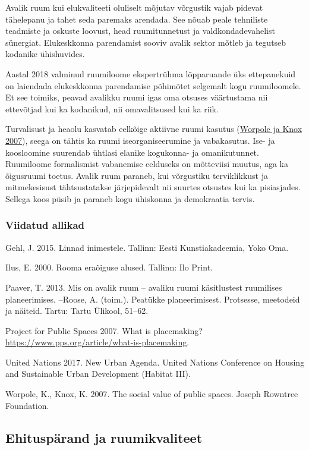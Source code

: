 \documentclass[estonian,]{article}
\begin{document}
Avalik ruum kui elukvaliteeti oluliselt mõjutav võrgustik vajab pidevat tähelepanu ja tahet seda paremaks arendada. See nõuab peale tehniliste teadmiste ja oskuste loovust, head ruumitunnetust ja valdkondadevahelist sünergiat. Elukeskkonna parendamist sooviv avalik sektor mõtleb ja tegutseb kodanike ühishuvides.

Aastal 2018 valminud ruumiloome ekspertrühma lõpparuande üks ettepanekuid on laiendada elukeskkonna parendamise põhimõtet selgemalt kogu ruumiloomele. Et see toimiks, peavad avalikku ruumi igas oma otsuses väärtustama nii ettevõtjad kui ka kodanikud, nii omavalitsused kui ka riik.

Turvalisust ja heaolu kasvatab eelkõige aktiivne ruumi kasutus (\protect\hyperlink{Worpole2007}{Worpole ja Knox 2007}), seega on tähtis ka ruumi iseorganiseerumine ja vabakasutus. Ise- ja koosloomine suurendab ühtlasi elanike kogukonna- ja omanikutunnet. Ruumiloome formalismist vabanemise eelduseks on mõtteviisi muutus, aga ka õigusruumi toetus. Avalik ruum paraneb, kui võrgustiku terviklikkust ja mitmekesisust tähtsustatakse järjepidevalt nii suurtes otsustes kui ka pisiasjades. Sellega koos püsib ja paraneb kogu ühiskonna ja demokraatia tervis.

\hypertarget{viidatud-allikad-7}{%
\subsubsection*{Viidatud allikad}\label{viidatud-allikad-7}}

Gehl, J. 2015. Linnad inimestele. Tallinn: Eesti Kunstiakadeemia, Yoko Oma.

Ilus, E. 2000. Rooma eraõiguse alused. Tallinn: Ilo Print.

Paaver, T. 2013. Mis on avalik ruum -- avaliku ruumi käsitlustest ruumilises planeerimises. --Roose, A. (toim.). Peatükke planeerimisest. Protsesse, meetodeid ja näiteid. Tartu: Tartu Ülikool, 51--62.

Project for Public Spaces 2007. What is placemaking? \url{https://www.pps.org/article/what-is-placemaking}.

United Nations 2017. New Urban Agenda. United Nations Conference on Housing and Sustainable Urban Development (Habitat III).

Worpole, K., Knox, K. 2007. The social value of public spaces. Joseph Rowntree Foundation.

\hypertarget{ehituspuxe4rand-ja-ruumikvaliteet}{%
\subsection{Ehituspärand ja ruumikvaliteet}\label{ehituspuxe4rand-ja-ruumikvaliteet}}
\end{document}
